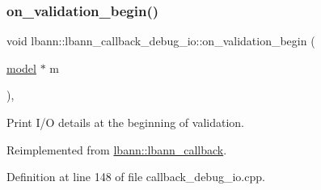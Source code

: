 \mbox{\label{classlbann_1_1lbann__callback__debug__io_ac26d9c113c1345cc1d6390141e1a894b}} 
\subsubsection{\texorpdfstring{on\+\_\+validation\+\_\+begin()}{on\_validation\_begin()}}
{\footnotesize\ttfamily void lbann\+::lbann\+\_\+callback\+\_\+debug\+\_\+io\+::on\+\_\+validation\+\_\+begin (\begin{DoxyParamCaption}\item[{\hyperlink{classlbann_1_1model}{model} $\ast$}]{m }\end{DoxyParamCaption})\hspace{0.3cm}{\ttfamily [override]}, {\ttfamily [virtual]}}

Print I/O details at the beginning of validation. 

Reimplemented from \hyperlink{classlbann_1_1lbann__callback_a2bde303671110519388d9962bc3e5583}{lbann\+::lbann\+\_\+callback}.



Definition at line 148 of file callback\+\_\+debug\+\_\+io.\+cpp.


